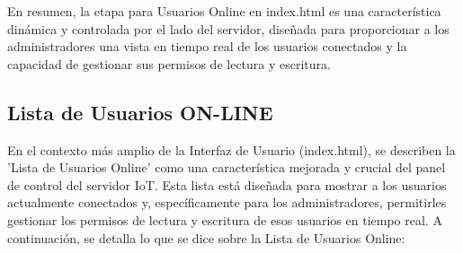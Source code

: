 \documentclass{report}
\begin{document}
En resumen, la etapa para Usuarios Online en index.html es una característica dinámica y controlada por el lado del servidor, 
diseñada para proporcionar a los administradores una vista en tiempo real de los usuarios conectados y la capacidad de gestionar 
sus permisos de lectura y escritura.

\subsection{Lista de Usuarios ON-LINE}
En el contexto más amplio de la Interfaz de Usuario (index.html), se  describen la 'Lista de Usuarios Online' como una 
característica mejorada y crucial del panel de control del servidor IoT. Esta lista está diseñada para mostrar a los usuarios 
actualmente conectados y, específicamente para los administradores, permitirles gestionar los permisos de lectura y escritura de 
esos usuarios en tiempo real.
A continuación, se detalla lo que se  dice sobre la Lista de Usuarios Online:
\end{document}
